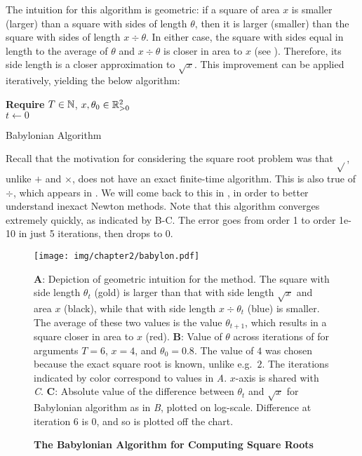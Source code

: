 \documentclass[../../thesis.tex]{subfiles}
\begin{document}
The intuition for this algorithm is geometric:
if a square of area $x$
is smaller (larger) than a square with sides of length $\theta$,
then it is larger (smaller) than the square with sides of length $x \div \theta$.
In either case, the square with sides equal in length to the average
of $\theta$ and $x \div \theta$
is closer in area to $x$
(see ).
Therefore, its side length is a closer approximation to $\sqrt{x}$.
This improvement can be applied iteratively,
yielding the below algorithm:
\\
\begin{algorithm}[H]
    \SetAlgoLined{}
    \textbf{Require}
    $T\in \mathbb{N}$, $x, \theta_0 \in \mathbb{R}_{> 0}^2$\ \\
    $t \leftarrow 0$\\
    \caption{Babylonian Algorithm}
\end{algorithm}
\noindent Recall that the motivation for considering the square root problem
was that $\sqrt{}$, unlike $+$ and $\times$,
does not have an exact finite-time algorithm.
This is also true of $\div$, which appears in .
We will come back to this in ,
in order to better understand inexact Newton methods.
Note that this algorithm converges extremely quickly,
as indicated by B-C.
The error goes from order 1 to order 1e-10
in just 5 iterations, then drops to $0$.

\begin{figure}[ht]
	\begin{center}
		\texttt{[image: img/chapter2/babylon.pdf]}
	\end{center}
	\caption{\textbf{The Babylonian Algorithm
	for Computing Square Roots}}{%
	\textbf{A}:
	Depiction of geometric intuition for the method.
	The square with side length $\theta_t$ (gold)
	is larger than that
	with side length $\sqrt{x}$ and area $x$ (black),
	while that with side length
	$x \div \theta_t$ (blue) is smaller.
	The average of these two values is the value $\theta_{t+1}$,
	which results in a square closer in area to $x$ (red).
	\textbf{B}:
	Value of $\theta$ across iterations of 
	for arguments $T=6$, $x = 4$, and $\theta_0=0.8$.
	The value of $4$ was chosen because the exact square root is known,
	unlike e.g.~$2$.
	The iterations indicated by color correspond to values in \emph{A}.
	$x$-axis is shared with \emph{C}.
	\textbf{C}:
	Absolute value of the difference between $\theta_t$ and $\sqrt{x}$
	for Babylonian algorithm as in \emph{B}, plotted on log-scale.
	Difference at iteration $6$ is $0$, and so is plotted off the chart.
	}
\end{figure}
\end{document}
